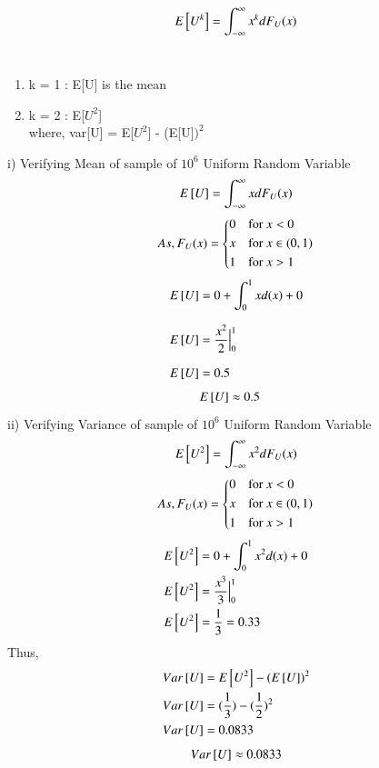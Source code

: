 \documentclass[journal,12pt,twocolumn]{IEEEtran}
\begin{document}
%
\begin{equation}
E{}\left[U^k\right] = \int_{-\infty}^{\infty}x^kdF_{U}(x)
\end{equation}
%
\solution \\
\begin{enumerate}
    \item k = 1 : E[U] is the mean
    \item k = 2 : E[$U^2$] \\
    where, var[U] = E[$U^2$] - (E[U$])^2$
\end{enumerate}
i) Verifying Mean of sample of $10^6$ Uniform Random Variable
\begin{align*}
    E{}\left[U\right] &= \int_{-\infty}^{\infty}xdF_{U}(x)\\
\end{align*}
\begin{equation}
    As,F_{U}(x) = 
    \begin{cases*}
        0 & for $x < 0$ \\
        x & for $x \in (0,1)$\\
        1 & for $x > 1$
    \end{cases*}
\end{equation}
\begin{align*}
    E{}\left[U\right] &= 0 + \int_{0}^{1}xd(x) + 0\\[7pt]
    E{}\left[U\right] &= \dfrac{x^2}{2} \Big|_0^1\\[7pt]
    E{}\left[U\right] &= 0.5
\end{align*}
%
    \begin{align}
        E{}\left[U\right] &\approx 0.5
    \end{align}
ii) Verifying Variance of sample of $10^6$ Uniform Random Variable
\begin{align*}
    E{}\left[U^2\right] = \int_{-\infty}^{\infty}x^2dF_{U}(x)
\end{align*}
\begin{equation*}
    As,F_{U}(x) = 
    \begin{cases*}
        0 & for $x < 0$ \\
        x & for $x \in (0,1)$\\
        1 & for $x > 1$
    \end{cases*}
\end{equation*}
\begin{align*}
        E{}\left[U^2\right] &= 0+\int_{0}^{1}x^2d(x)+0\\
        E{}\left[U^2\right] &= \dfrac{x^3}{3} \Big|_0^1\\
        E{}\left[U^2\right] &= \dfrac{1}{3} = 0.33 \\
    \end{align*}
Thus,
\begin{align*}
    Var{}\left[U\right] &= E{}\left[U^2\right] - (E{}\left[U\right])^2\\
    Var{}\left[U\right] &= (\dfrac{1}{3}) - (\dfrac{1}{2})^2\\
    Var{}\left[U\right] &= 0.0833
    \end{align*}
%    
    \begin{align}
        Var{}\left[U\right] \approx 0.0833
    \end{align}
\end{document}
